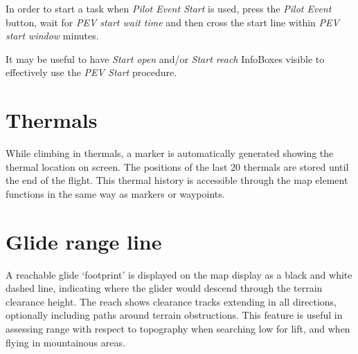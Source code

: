 In order to start a task when \emph{Pilot Event Start} is used, press the \emph
{Pilot Event} button, wait for \emph{PEV start wait time} and then cross the
start line within \emph{PEV start window} minutes.

\tip It may be useful to have \emph{Start open} and/or \emph{Start reach}
 InfoBoxes visible to effectively use the \emph{PEV Start} procedure.


\section{Thermals}

While climbing in thermals, a marker is automatically generated showing the
thermal location on screen.    The positions of the last 20 thermals are
stored until the end of the flight.
This thermal history is accessible through the map
element functions in the same way as markers or waypoints.


\section{Glide range line}\label{sec:reach}

A reachable glide `footprint' is displayed on the map display as a
black and white dashed line, indicating where the glider would descend
through the terrain clearance height.  The reach shows clearance
tracks extending in all directions, optionally including paths around
terrain obstructions.  This feature is useful in assessing range with
respect to topography when searching low for lift, and when flying in
mountainous areas.


